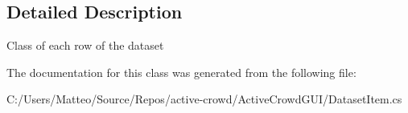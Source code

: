 \subsection{Detailed Description}
Class of each row of the dataset 



The documentation for this class was generated from the following file\+:\begin{DoxyCompactItemize}
\item 
C\+:/\+Users/\+Matteo/\+Source/\+Repos/active-\/crowd/\+Active\+Crowd\+G\+U\+I/Dataset\+Item.\+cs\end{DoxyCompactItemize}
